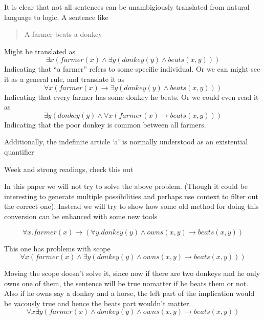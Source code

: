 \documentclass[12pt]{article}
\begin{document}
It is clear that not all sentences can be unambigiously translated from natural language to logic. A sentence like 	
\begin{quotation}
A farmer beats a donkey
\end{quotation}
Might be translated as 
\begin{equation}
\exists x ( farmer(x) \wedge \exists y ( donkey(y) \wedge beats(x,y)))
\end{equation}
Indicating that ``a farmer'' refers to some specific individual. Or we can might see it as a general rule, and translate it as
\begin{equation}
\forall x ( farmer(x) \rightarrow \exists y ( donkey(y) \wedge beats(x,y)))
\end{equation}
Indicating that every farmer has some donkey he beats. Or we could even read it as
\begin{equation}
\exists y ( donkey(y) \wedge \forall x ( farmer(x) \rightarrow beats(x,y)))
\end{equation}
Indicating that the poor donkey is common between all farmers.

Additionally, the indefinite article `a' is normally understood as an existential quantifier

Week and strong readings, check this out \cite{kanazawa1994weak}

In this paper we will not try to solve the above problem. (Though it could be interesting to generate multiple possibilities and perhaps use context to filter out the correct one). Instead we will try to show how some old method for doing this conversion can be enhanced with some new tools

\begin{equation}
\forall x . farmer(x) \rightarrow (\forall y . donkey(y) \wedge owns(x,y) \rightarrow beats(x,y))
\end{equation}

This one has problems with scope
\begin{equation}
\forall x (farmer(x) \wedge \exists y (donkey(y) \wedge owns(x,y) \rightarrow beats(x,y)))
\end{equation}

Moving the scope doesn't solve it, since now if there are two donkeys and he only owns one of them, the sentence will be true nomatter if he beats them or not. Also if he owns say a donkey and a horse, the left part of the implication would be vacously true and hence the beats part wouldn't matter.
\begin{equation}
\forall x \exists y (farmer(x) \wedge donkey(y) \wedge owns(x,y) \rightarrow beats(x,y))
\end{equation}
\end{document}

